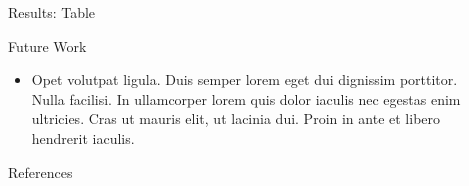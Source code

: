 \documentclass[final,hyperref={pdfpagelabels=false}]{beamer}
\begin{document}
\begin{frame}[t]
\begin{columns}[t]
\begin{column}{.465\textwidth}
{\begin{block}{Results: Table}
\end{block}
}




\begin{block}{Future Work}

\begin{itemize}
\item Opet \alert{volutpat} ligula. Duis semper lorem eget dui dignissim porttitor. Nulla facilisi. In ullamcorper lorem quis dolor iaculis nec egestas enim ultricies. Cras ut mauris elit, ut lacinia dui. Proin in ante et libero hendrerit iaculis.
\end{itemize}

\end{block}


\begin{block}{References}
        
\nocite{*} %
\small{
}

\end{block}


\end{column} %

\begin{column}{.015\textwidth}\end{column} %

\end{columns} %

\end{frame} %
\end{document}
